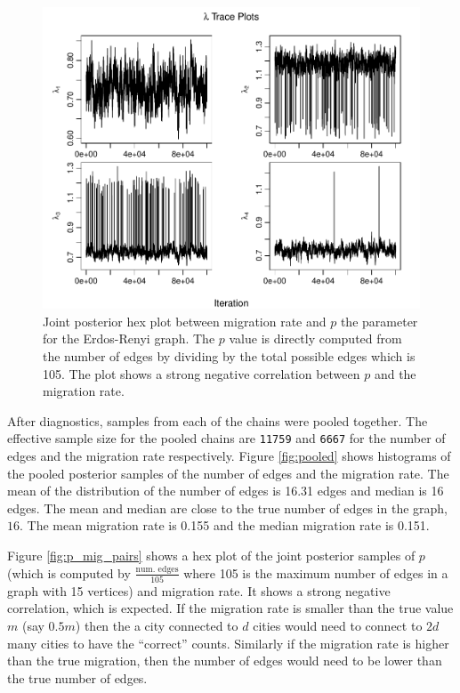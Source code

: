 \documentclass[11pt,a4paper]{article}
\begin{document}
\begin{figure}

{\centering \includegraphics[width=0.65\linewidth]{thesis_draft_files/figure-latex/unnamed-chunk-5-1} 

}

\caption{\label{fig:p_mig_pairs} Joint posterior hex plot between migration rate and $p$ the parameter for the Erdos-Renyi graph. The $p$ value is directly computed from the number of edges by dividing by the total possible edges which is 105. The plot shows a strong negative correlation between $p$ and the migration rate.}\label{fig:unnamed-chunk-5}
\end{figure}

After diagnostics, samples from each of the chains were pooled together.
The effective sample size for the pooled chains are \texttt{11759} and
\texttt{6667} for the number of edges and the migration rate
respectively. Figure \ref{fig:pooled} shows histograms of the pooled
posterior samples of the number of edges and the migration rate. The
mean of the distribution of the number of edges is 16.31 edges and
median is 16 edges. The mean and median are close to the true number of
edges in the graph, \(16\). The mean migration rate is 0.155 and the
median migration rate is 0.151.

Figure \ref{fig:p_mig_pairs} shows a hex plot of the joint posterior
samples of \(p\) (which is computed by \(\frac{\text{num. edges}}{105}\)
where 105 is the maximum number of edges in a graph with 15 vertices)
and migration rate. It shows a strong negative correlation, which is
expected. If the migration rate is smaller than the true value \(m\)
(say \(0.5m\)) then the a city connected to \(d\) cities would need to
connect to \(2d\) many cities to have the ``correct'' counts. Similarly
if the migration rate is higher than the true migration, then the number
of edges would need to be lower than the true number of edges.
\end{document}
